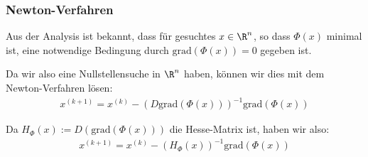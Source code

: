 \subsubsection{Newton-Verfahren}
Aus der Analysis ist bekannt, dass für gesuchtes $x \in \R^n$, so dass $\Phi(x)$ minimal ist, eine notwendige Bedingung durch $\text{grad}(\Phi(x)) = 0$ gegeben ist.

Da wir also eine Nullstellensuche in $\R^n$ haben, können wir dies mit dem Newton-Verfahren lösen:
\rmvspace
\begin{align*}
    x^{(k + 1)} = x^{(k)} - (D \text{grad}(\Phi(x)))^{-1}\text{grad}(\Phi(x))
\end{align*}

\drmvspace
Da $H_\Phi(x) := D(\text{grad}(\Phi(x)))$ die Hesse-Matrix ist, haben wir also:
\rmvspace
\begin{align*}
    x^{(k + 1)} = x^{(k)} - (H_\Phi(x))^{-1}\text{grad}(\Phi(x))
\end{align*}

